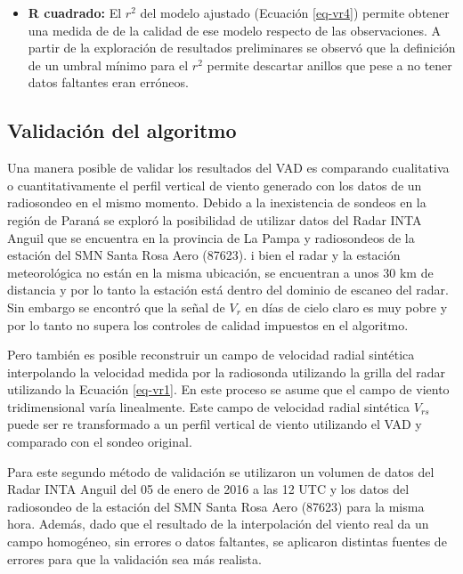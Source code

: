 \documentclass[12pt,spanish,oneside]{book}
\providecommand{\tightlist}{%
  \setlength{\itemsep}{0pt}\setlength{\parskip}{0pt}}
\begin{document}
\begin{itemize}
\tightlist
\item
  \textbf{R cuadrado:} El \(r^2\) del modelo ajustado (Ecuación
  \ref{eq-vr4}) permite obtener una medida de de la calidad de ese
  modelo respecto de las observaciones. A partir de la exploración de
  resultados preliminares se observó que la definición de un umbral
  mínimo para el \(r^2\) permite descartar anillos que pese a no tener
  datos faltantes eran erróneos.
\end{itemize}

\subsection{Validación del algoritmo}\label{validacion-del-algoritmo}

Una manera posible de validar los resultados del VAD es comparando
cualitativa o cuantitativamente el perfil vertical de viento generado
con los datos de un radiosondeo en el mismo momento. Debido a la
inexistencia de sondeos en la región de Paraná se exploró la posibilidad
de utilizar datos del Radar INTA Anguil que se encuentra en la provincia
de La Pampa y radiosondeos de la estación del SMN Santa Rosa Aero
(87623). i bien el radar y la estación meteorológica no están en la
misma ubicación, se encuentran a unos 30 km de distancia y por lo tanto
la estación está dentro del dominio de escaneo del radar. Sin embargo se
encontró que la señal de \(V_r\) en días de cielo claro es muy pobre y
por lo tanto no supera los controles de calidad impuestos en el
algoritmo.

Pero también es posible reconstruir un campo de velocidad radial
sintética interpolando la velocidad medida por la radiosonda utilizando
la grilla del radar utilizando la Ecuación \ref{eq-vr1}. En este proceso
se asume que el campo de viento tridimensional varía linealmente. Este
campo de velocidad radial sintética \(V_{rs}\) puede ser re transformado
a un perfil vertical de viento utilizando el VAD y comparado con el
sondeo original.

Para este segundo método de validación se utilizaron un volumen de datos
del Radar INTA Anguil del 05 de enero de 2016 a las 12 UTC y los datos
del radiosondeo de la estación del SMN Santa Rosa Aero (87623) para la
misma hora. Además, dado que el resultado de la interpolación del viento
real da un campo homogéneo, sin errores o datos faltantes, se aplicaron
distintas fuentes de errores para que la validación sea más realista.
\end{document}
